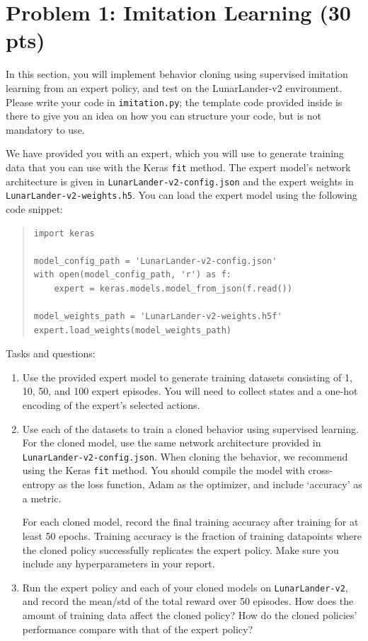 \documentclass[12pt]{article}
\begin{document}
\newpage
\section*{Problem 1: Imitation Learning (30 pts)}

In this section, you will implement behavior cloning using supervised imitation learning from an expert policy, and test on the LunarLander-v2 environment. Please write your code in \texttt{imitation.py}; the template code provided inside is there to give you an idea on how you can structure your code, but is not mandatory to use.

We have provided you with an expert, which you will use to generate training data that you can use with the Keras \texttt{fit} method. The expert model's network architecture is given in \texttt{LunarLander-v2-config.json} and the expert weights in \texttt{LunarLander-v2-weights.h5}. You can load the expert model using the following code snippet:
\begin{quote}
\begin{verbatim}
import keras

model_config_path = 'LunarLander-v2-config.json'
with open(model_config_path, 'r') as f:
    expert = keras.models.model_from_json(f.read())

model_weights_path = 'LunarLander-v2-weights.h5f'
expert.load_weights(model_weights_path)
\end{verbatim}
\end{quote}

Tasks and questions:
\begin{enumerate}
\item Use the provided expert model to generate training datasets consisting of 1, 10, 50, and 100 expert episodes. You will need to collect states and a one-hot encoding of the expert's selected actions.

\item Use each of the datasets to train a cloned behavior using supervised learning. For the cloned model, use the same network architecture provided in \texttt{LunarLander-v2-config.json}. When cloning the behavior, we recommend using the Keras \texttt{fit} method. You should compile the model with cross-entropy as the loss function, Adam as the optimizer, and include `accuracy' as a metric. 

For each cloned model, record the final training accuracy after training for at least 50 epochs. Training accuracy is the fraction of training datapoints where the cloned policy successfully replicates the expert policy. Make sure you include any hyperparameters in your report. 

\item Run the expert policy and each of your cloned models on \texttt{LunarLander-v2}, and record the mean/std of the total reward over 50 episodes. How does the amount of training data affect the cloned policy? How do the cloned policies' performance compare with that of the expert policy?
\end{enumerate}
\end{document}
